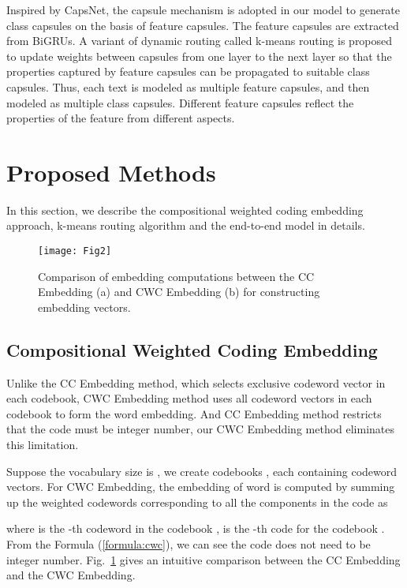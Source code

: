 \documentclass[times,twocolumn,final]{elsarticle}
\begin{document}
Inspired by CapsNet, the capsule mechanism is adopted in our model to generate class capsules on the basis of feature capsules. The feature capsules are extracted from BiGRUs. A variant of dynamic routing called k-means routing is proposed to update weights between capsules from one layer to the next layer so that the properties captured by feature capsules can be propagated to suitable class capsules. Thus, each text is modeled as multiple feature capsules, and then modeled as multiple class capsules. Different feature capsules reflect the properties of the feature from different aspects.

\section{Proposed Methods}

In this section, we describe the compositional weighted coding embedding approach, k-means routing algorithm and the end-to-end model in details.

\begin{figure}
  \centering
  \texttt{[image: Fig2]}
  \caption{Comparison of embedding computations between the CC Embedding (a) and CWC Embedding (b) for constructing embedding vectors.}
  \label{embedding_layer}
\end{figure}

\subsection{Compositional Weighted Coding Embedding}

Unlike the CC Embedding method, which selects exclusive codeword vector in each codebook, CWC Embedding method uses all codeword vectors in each codebook to form the word embedding. And CC Embedding method restricts that the code must be integer number, our CWC Embedding method eliminates this limitation.

Suppose the vocabulary size is , we create  codebooks , each containing  codeword vectors. For CWC Embedding, the embedding of word  is computed by summing up the weighted codewords corresponding to all the components in the code as
    
where  is the -th codeword in the codebook ,  is the -th code for the codebook . From the Formula (\ref{formula:cwc}), we can see the code does not need to be integer number. Fig.~\ref{embedding_layer} gives an intuitive comparison between the CC Embedding and the CWC Embedding. 
\end{document}
